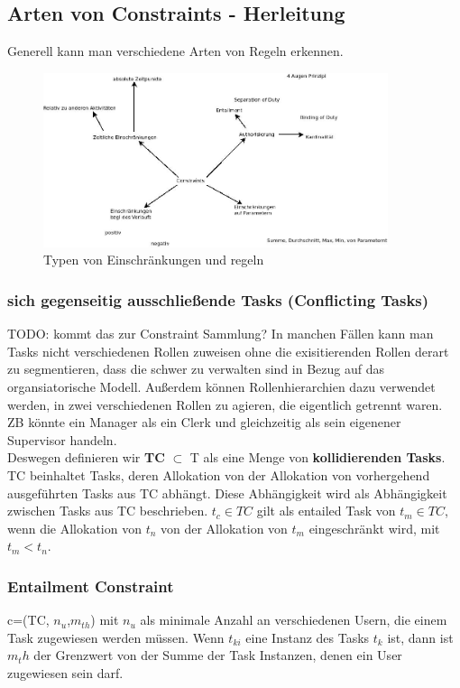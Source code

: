 %
%
\subsection{Arten von Constraints - Herleitung}

Generell kann man verschiedene Arten von Regeln erkennen.\\

\begin{figure}[ht]
	\centering
  \includegraphics[width=0.9\textwidth]{Figures/Constraints}
	\caption{Typen von Einschränkungen und regeln}
	\label{fig:constraints}
\end{figure}

\subsubsection{sich gegenseitig ausschließende Tasks (Conflicting Tasks)}
TODO: kommt das zur Constraint Sammlung?
In manchen Fällen kann man Tasks nicht verschiedenen Rollen zuweisen  ohne die exisitierenden Rollen derart zu segmentieren, dass die schwer zu verwalten sind in Bezug auf das organsiatorische Modell. Außerdem können Rollenhierarchien dazu verwendet werden, in zwei verschiedenen Rollen zu agieren, die eigentlich getrennt waren. ZB könnte ein Manager als ein Clerk und gleichzeitig als sein eigenener Supervisor handeln.\\
Deswegen definieren wir \textbf{TC} $\subset$ T als eine Menge von \textbf{kollidierenden Tasks}. TC beinhaltet Tasks, deren Allokation von der Allokation von vorhergehend ausgeführten Tasks aus TC abhängt. Diese Abhängigkeit wird als Abhängigkeit zwischen Tasks aus TC beschrieben. $t_c\in TC$ gilt als entailed Task von $t_m\in TC$, wenn die Allokation von $t_n$ von der Allokation von $t_m$ eingeschränkt wird, mit $t_m<t_n$.
\cite{wolter_modeling_of_TBAC_in_BPMN}

\subsubsection{Entailment Constraint}
c=(TC, $n_u$,$m_{th}$) mit $n_u$ als minimale Anzahl an verschiedenen Usern, die einem Task zugewiesen werden müssen. Wenn $t_{ki}$ eine Instanz des Tasks $t_k$ ist, dann ist $m_th$ der Grenzwert von der Summe der Task Instanzen, denen ein User zugewiesen sein darf.
\cite{wolter_modeling_of_TBAC_in_BPMN}

